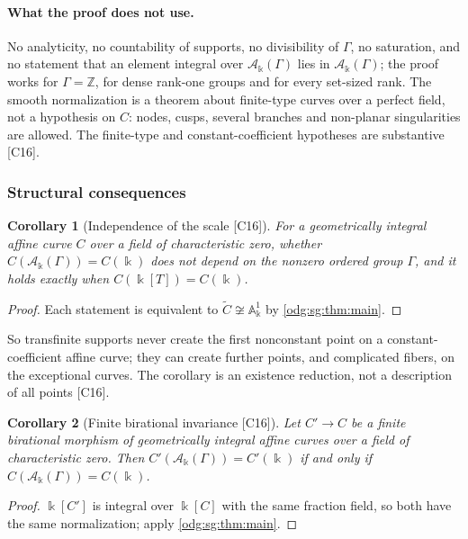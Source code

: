 \documentclass[11pt,oneside]{article}
\numberwithin{equation}{section}
\newtheorem{corollary}[corollary]{Corollary}
\theoremstyle{definition}
\theoremstyle{remark}
\newcommand{\Z}{\mathbb Z}
\newcommand{\src}[1]{\textup{\textsf{\small[#1]}}}
\newcommand{\crA}{\mathcal A_\Bbbk(\Gamma)}
\newcommand{\Aff}{\mathbb A}
\begin{document}
\paragraph{What the proof does not use.} No analyticity, no countability of supports, no
divisibility of $\Gamma$, no saturation, and no statement that an element integral over
$\crA$ lies in $\crA$; the proof works for $\Gamma=\Z$, for dense rank-one groups and for
every set-sized rank. The smooth normalization is a theorem about finite-type curves over
a perfect field, not a hypothesis on $C$: nodes, cusps, several branches and non-planar
singularities are allowed. The finite-type and constant-coefficient hypotheses are
substantive \src{C16}.

\subsubsection{Structural consequences}\label{odg:sg:sub:structure}

\begin{corollary}[Independence of the scale \src{C16}]\label{odg:sg:cor:scale}
For a geometrically integral affine curve $C$ over a field of characteristic zero, whether
$C(\crA)=C(\Bbbk)$ does not depend on the nonzero ordered group $\Gamma$, and it holds
exactly when $C(\Bbbk[T])=C(\Bbbk)$.
\end{corollary}
\begin{proof}
Each statement is equivalent to $\widetilde C\not\cong\Aff^1_\Bbbk$ by
\cref{odg:sg:thm:main}.
\end{proof}

So transfinite supports never create the first nonconstant point on a constant-coefficient
affine curve; they can create further points, and complicated fibers, on the exceptional
curves. The corollary is an existence reduction, not a description of all points
\src{C16}.

\begin{corollary}[Finite birational invariance \src{C16}]\label{odg:sg:cor:birational}
Let $C'\to C$ be a finite birational morphism of geometrically integral affine curves over a
field of characteristic zero. Then $C'(\crA)=C'(\Bbbk)$ if and only if $C(\crA)=C(\Bbbk)$.
\end{corollary}
\begin{proof}
$\Bbbk[C']$ is integral over $\Bbbk[C]$ with the same fraction field, so both have the same
normalization; apply \cref{odg:sg:thm:main}.
\end{proof}
\end{document}
